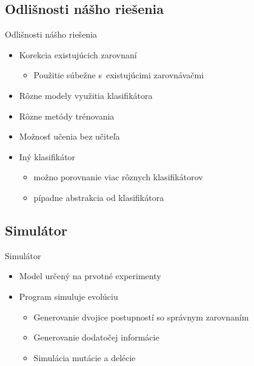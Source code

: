 \documentclass[xcolor=dvipsnames, compress, 12pt, t]{beamer}
\begin{document}
\subsection{Odlišnosti nášho riešenia}
\begin{frame}{Odlišnosti nášho riešenia}
  \begin{itemize}
    \item Korekcia existujúcich zarovnaní
    \begin{itemize}
      \item Použitie súbežne s~existujúcimi zarovnávačmi
    \end{itemize}
    \pause
    \item Rôzne modely využitia klasifikátora
    \pause
    \item Rôzne metódy trénovania
    \pause
    \item Možnosť učenia bez učiteľa
    \pause
    \item Iný klasifikátor
    \begin{itemize}
      \item možno porovnanie viac rôznych klasifikátorov
      \item pípadne abstrakcia od klasifikátora
    \end{itemize}
  \end{itemize}
\end{frame}


\subsection{Simulátor}
\begin{frame}{Simulátor}
  \begin{itemize}
    \item Model určený na prvotné experimenty
    \item Program simuluje evolúciu
    \begin{itemize}
      \item Generovanie dvojice postupností so správnym zarovnaním
      \item Generovanie dodatočej informácie
      \item Simulácia mutácie a delécie
    \end{itemize}
  \end{itemize}
\end{frame}

\end{document}
